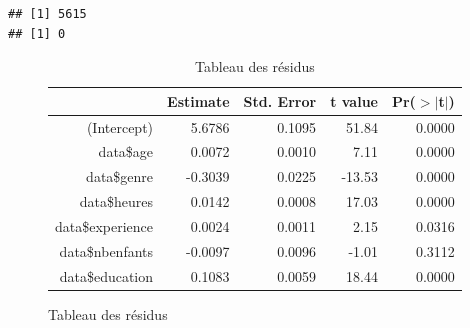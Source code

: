 \documentclass[a4paper, french, 11 pt]{article}\usepackage[]{graphicx}\usepackage[]{xcolor}
\makeatletter
\newenvironment{kframe}{%
 \def\at@end@of@kframe{}%
 \ifinner\ifhmode%
  \def\at@end@of@kframe{\end{minipage}}%
  \begin{minipage}{\columnwidth}%
 \fi\fi%
 \def\FrameCommand##1{\hskip\@totalleftmargin \hskip-\fboxsep
 \colorbox{shadecolor}{##1}\hskip-\fboxsep
     \hskip-\linewidth \hskip-\@totalleftmargin \hskip\columnwidth}%
 \MakeFramed {\advance\hsize-\width
   \@totalleftmargin\z@ \linewidth\hsize
   \@setminipage}}%
 {\par\unskip\endMakeFramed%
 \at@end@of@kframe}
\newenvironment{knitrout}{}{} %
\makeatother
\begin{document}
\begin{knitrout}
\color{fgcolor}\begin{kframe}
\begin{verbatim}
## [1] 5615
## [1] 0
\end{verbatim}
\end{kframe}
\end{knitrout}


\begin{figure}
\begin{table}[ht]
\centering
\caption{Tableau des résidus} 
\label{tb:lm1}
\begin{tabular}{rrrrr}
  \toprule
 & Estimate & Std. Error & t value & Pr($>$$|$t$|$) \\ 
  \midrule
(Intercept) & 5.6786 & 0.1095 & 51.84 & 0.0000 \\ 
  data\$age & 0.0072 & 0.0010 & 7.11 & 0.0000 \\ 
  data\$genre & -0.3039 & 0.0225 & -13.53 & 0.0000 \\ 
  data\$heures & 0.0142 & 0.0008 & 17.03 & 0.0000 \\ 
  data\$experience & 0.0024 & 0.0011 & 2.15 & 0.0316 \\ 
  data\$nbenfants & -0.0097 & 0.0096 & -1.01 & 0.3112 \\ 
  data\$education & 0.1083 & 0.0059 & 18.44 & 0.0000 \\ 
   \bottomrule
\end{tabular}
\end{table}

\end{figure}
\end{document}
